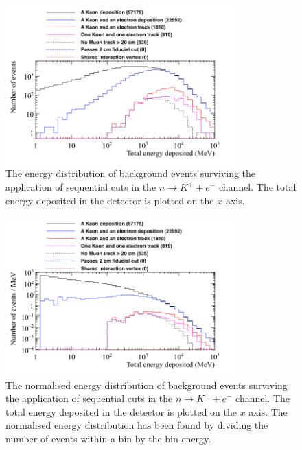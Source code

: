 \begin{figure}[h!]
  \centering
  \includegraphics[width=0.8\textwidth]{CosmicBackground_EnergyDepCuts_Raw_2cmCut}
  \caption[The energy distribution of background events surviving the application of sequential cuts in the $n \rightarrow K^{+} + e^{-}$ channel]
          {The energy distribution of background events surviving the application of sequential cuts in the $n \rightarrow K^{+} + e^{-}$ channel. The total energy deposited in the detector is plotted on the $x$ axis.}
  \label{fig:NDK_CosmoBack_Raw}
\end{figure}

\begin{figure}[h!]
  \centering
  \includegraphics[width=0.8\textwidth]{CosmicBackground_EnergyDepCuts_Norm_2cmCut}
  \caption[The normalised energy distribution of background events surviving the application of sequential cuts in the $n \rightarrow K^{+} + e^{-}$ channel]
          {The normalised energy distribution of background events surviving the application of sequential cuts in the $n \rightarrow K^{+} + e^{-}$ channel. The total energy deposited in the detector is plotted on the $x$ axis. The normalised energy distribution has been found by dividing the number of events within a bin by the bin energy.}
  \label{fig:NDK_CosmoBack_Norm}
\end{figure}

